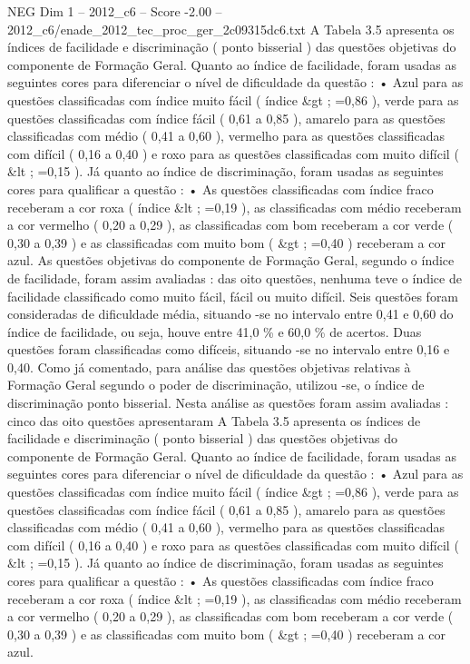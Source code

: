 \begin{textsample}{NEG Dim 1 – 2012\_c6 – Score -2.00 – 2012\_c6/enade\_2012\_tec\_proc\_ger\_2c09315dc6.txt}
A Tabela 3.5 apresenta os índices de facilidade e discriminação ( ponto bisserial ) das questões objetivas do componente de Formação Geral.
Quanto ao índice de facilidade, foram usadas as seguintes cores para diferenciar o nível de dificuldade da questão : • Azul para as questões classificadas com índice muito fácil ( índice \&gt ; =0,86 ), verde para as questões classificadas com índice fácil ( 0,61 a 0,85 ), amarelo para as questões classificadas com médio ( 0,41 a 0,60 ), vermelho para as questões classificadas com difícil ( 0,16 a 0,40 ) e roxo para as questões classificadas com muito difícil ( \&lt ; =0,15 ).
Já quanto ao índice de discriminação, foram usadas as seguintes cores para qualificar a questão : • As questões classificadas com índice fraco receberam a cor roxa ( índice \&lt ; =0,19 ), as classificadas com médio receberam a cor vermelho ( 0,20 a 0,29 ), as classificadas com bom receberam a cor verde ( 0,30 a 0,39 ) e as classificadas com muito bom ( \&gt ; =0,40 ) receberam a cor azul.
As questões objetivas do componente de Formação Geral, segundo o índice de facilidade, foram assim avaliadas : das oito questões, nenhuma teve o índice de facilidade classificado como muito fácil, fácil ou muito difícil.
Seis questões foram consideradas de dificuldade média, situando -se no intervalo entre 0,41 e 0,60 do índice de facilidade, ou seja, houve entre 41,0 \% e 60,0 \% de acertos.
Duas questões foram classificadas como difíceis, situando -se no intervalo entre 0,16 e 0,40.
Como já comentado, para análise das questões objetivas relativas à Formação Geral segundo o poder de discriminação, utilizou -se, o índice de discriminação ponto bisserial.
Nesta análise as questões foram assim avaliadas : cinco das oito questões apresentaram A Tabela 3.5 apresenta os índices de facilidade e discriminação ( ponto bisserial ) das questões objetivas do componente de Formação Geral.
Quanto ao índice de facilidade, foram usadas as seguintes cores para diferenciar o nível de dificuldade da questão : • Azul para as questões classificadas com índice muito fácil ( índice \&gt ; =0,86 ), verde para as questões classificadas com índice fácil ( 0,61 a 0,85 ), amarelo para as questões classificadas com médio ( 0,41 a 0,60 ), vermelho para as questões classificadas com difícil ( 0,16 a 0,40 ) e roxo para as questões classificadas com muito difícil ( \&lt ; =0,15 ).
Já quanto ao índice de discriminação, foram usadas as seguintes cores para qualificar a questão : • As questões classificadas com índice fraco receberam a cor roxa ( índice \&lt ; =0,19 ), as classificadas com médio receberam a cor vermelho ( 0,20 a 0,29 ), as classificadas com bom receberam a cor verde ( 0,30 a 0,39 ) e as classificadas com muito bom ( \&gt ; =0,40 ) receberam a cor azul.

\end{textsample}
